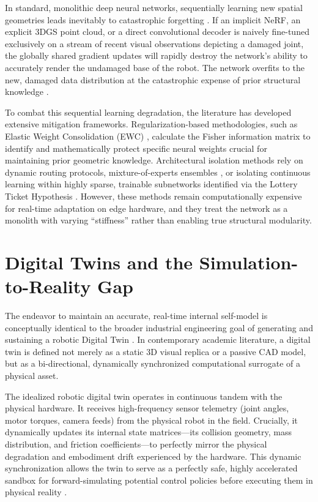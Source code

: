 \documentclass[12pt,a4paper,oneside]{report}
\begin{document}
In standard, monolithic deep neural networks, sequentially learning new spatial geometries leads inevitably to catastrophic forgetting \cite{mccloskey1989catastrophic, french1999catastrophic}. If an implicit NeRF, an explicit 3DGS point cloud, or a direct convolutional decoder is naively fine-tuned exclusively on a stream of recent visual observations depicting a damaged joint, the globally shared gradient updates will rapidly destroy the network's ability to accurately render the undamaged base of the robot. The network overfits to the new, damaged data distribution at the catastrophic expense of prior structural knowledge \cite{kirkpatrick2017overcoming}.

To combat this sequential learning degradation, the literature has developed extensive mitigation frameworks. Regularization-based methodologies, such as Elastic Weight Consolidation (EWC) \cite{kirkpatrick2017overcoming}, calculate the Fisher information matrix to identify and mathematically protect specific neural weights crucial for maintaining prior geometric knowledge. Architectural isolation methods rely on dynamic routing protocols, mixture-of-experts ensembles \cite{mocanu2018scalable}, or isolating continuous learning within highly sparse, trainable subnetworks identified via the Lottery Ticket Hypothesis \cite{frankle2018lottery}. However, these methods remain computationally expensive for real-time adaptation on edge hardware, and they treat the network as a monolith with varying ``stiffness'' rather than enabling true structural modularity.

\section{Digital Twins and the Simulation-to-Reality Gap}
\label{sec:digital_twins}

The endeavor to maintain an accurate, real-time internal self-model is conceptually identical to the broader industrial engineering goal of generating and sustaining a robotic Digital Twin \cite{jiang2024digitaltwin, mari2024digitaltwin}. In contemporary academic literature, a digital twin is defined not merely as a static 3D visual replica or a passive CAD model, but as a bi-directional, dynamically synchronized computational surrogate of a physical asset.

The idealized robotic digital twin operates in continuous tandem with the physical hardware. It receives high-frequency sensor telemetry (joint angles, motor torques, camera feeds) from the physical robot in the field. Crucially, it dynamically updates its internal state matrices—its collision geometry, mass distribution, and friction coefficients—to perfectly mirror the physical degradation and embodiment drift experienced by the hardware. This dynamic synchronization allows the twin to serve as a perfectly safe, highly accelerated sandbox for forward-simulating potential control policies before executing them in physical reality \cite{sun2026digitaltwin, murugesan2024digitaltwin}.
\end{document}
